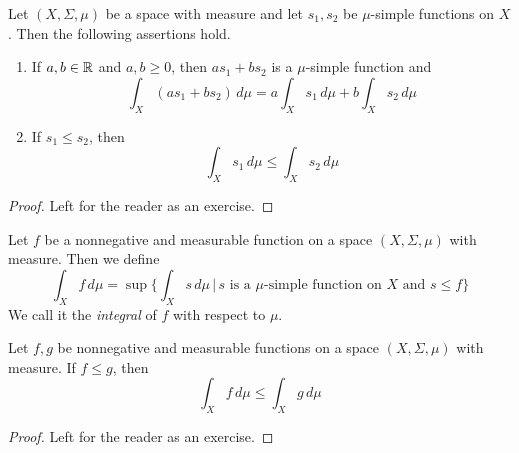 \documentclass[10pt]{amsart}
\begin{document}
\begin{fact}\label{fact:basics_for_simple_functions}
	Let $(X,\Sigma,\mu)$ be a space with measure and let $s_1, s_2$ be $\mu$-simple functions on $X$. Then the following assertions hold.
	\begin{enumerate}[label=\emph{\textbf{(\arabic*)}}, leftmargin=*]
		\item If $a, b\in {\mathbb R}$ and $a, b\geq 0$, then $a s_1 + b s_2$ is a $\mu$-simple function and
		      $$\int_X\left(a s_1 + b s_2\right)\,d\mu = a \int_Xs_1\,d\mu + b \int_Xs_2\,d\mu$$
		\item If $s_1\leq s_2$, then
		      $$\int_Xs_1\,d\mu \leq \int_Xs_2\,d\mu$$
	\end{enumerate}
\end{fact}
\begin{proof}
	Left for the reader as an exercise.
\end{proof}

\begin{definition}
	Let $f$ be a nonnegative and measurable function on a space $(X,\Sigma,\mu)$ with measure. Then we define
	$$\int_X f\,d\mu = \sup\bigg\{\int_X s\, d\mu\,\bigg|\,s\mbox{ is a }\mu\mbox{-simple function on }X\mbox{ and }s\leq f\bigg\}$$
	We call it the \textit{integral} of $f$ with respect to $\mu$.
\end{definition}

\begin{fact}\label{fact:integral_is_monotone}
	Let $f,g$ be nonnegative and measurable functions on a space $(X,\Sigma,\mu)$ with measure. If $f\leq g$, then
	$$\int_Xf\,d\mu \leq \int_Xg\,d\mu$$
\end{fact}
\begin{proof}
	Left for the reader as an exercise.
\end{proof}
\end{document}
